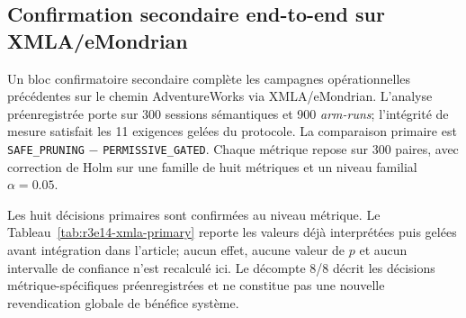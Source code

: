 \subsection{Confirmation secondaire end-to-end sur XMLA/eMondrian}
\label{subsec:r3e14-xmla-resource-confirmation}

Un bloc confirmatoire secondaire complète les campagnes opérationnelles précédentes sur le
chemin AdventureWorks via XMLA/eMondrian. L'analyse préenregistrée porte sur 300 sessions
sémantiques et 900 \emph{arm-runs}; l'intégrité de mesure satisfait les 11 exigences gelées
du protocole. La comparaison primaire est \texttt{SAFE\_PRUNING} $-$
\texttt{PERMISSIVE\_GATED}. Chaque métrique repose sur 300 paires, avec correction de Holm
sur une famille de huit métriques et un niveau familial $\alpha=0.05$.

Les huit décisions primaires sont confirmées au niveau métrique. Le Tableau~\ref{tab:r3e14-xmla-primary}
reporte les valeurs déjà interprétées puis gelées avant intégration dans l'article; aucun effet,
aucune valeur de $p$ et aucun intervalle de confiance n'est recalculé ici. Le décompte 8/8
décrit les décisions métrique-spécifiques préenregistrées et ne constitue pas une nouvelle
revendication globale de bénéfice système.

